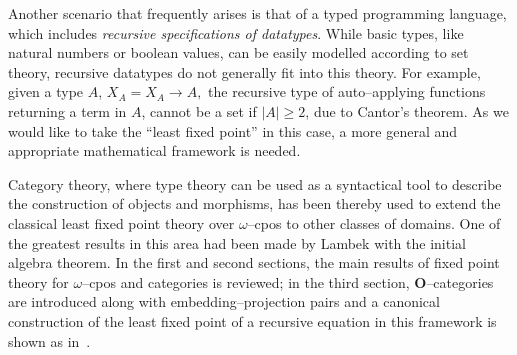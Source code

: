 Another scenario that frequently arises is that of a typed programming language, which includes \emph{recursive specifications of datatypes}.
While basic types, like natural numbers or boolean values, can be easily modelled according to set theory, recursive datatypes do not generally fit into this theory.
For example, given a type \(A\),
\(X_A = X_A \to A,\)
the recursive type of auto--applying functions returning a term in \(A\), cannot be a set if \(\lvert A \rvert \ge 2\), due to Cantor's theorem.
As we would like to take the ``least fixed point'' in this case, a more general and appropriate mathematical framework is needed.

Category theory, where type theory can be used as a syntactical tool to describe the construction of objects and morphisms, has been thereby used to extend the classical least fixed point theory over \(\omega\)--cpos to other classes of domains. One of the greatest results in this area had been made by Lambek with the initial algebra theorem.
%
%
In the first and second sections, the main results of fixed point theory for \(\omega\)--cpos and categories is reviewed; in the third section, \(\mathbf{O}\)--categories are introduced along with embedding--projection pairs and a canonical construction of the least fixed point of a recursive equation in this framework is shown as in~\cite{Smyth1982}.
